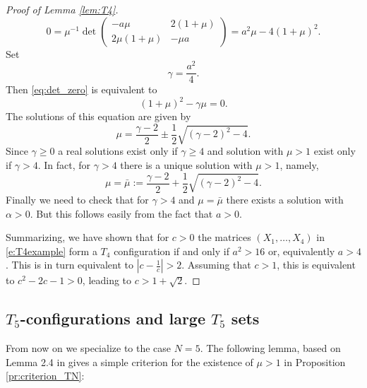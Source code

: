 \documentclass[titlepage]{amsart}
\numberwithin{equation}{section}
\theoremstyle{plain}
\theoremstyle{definition}
\theoremstyle{remark}
\begin{document}
\begin{proof}[Proof of Lemma \ref{lem:T4}]
\begin{equation}
0 = \mu^{-1} \det \begin{pmatrix} -a \mu &  2 (1 + \mu) \\
 2\mu (1 + \mu) &- \mu a
\end{pmatrix} = a^2 \mu - 4 (1+ \mu)^2.
\end{equation}
Set 
$$ \gamma = \frac{a^2}{4}.$$
Then  \eqref{eq:det_zero}
is equivalent to 
\begin{equation}   \label{eq:quadratic_eqn_mu}  (1 + \mu)^2 - \gamma \mu = 0.
\end{equation}
The solutions of this equation are given by 
$$ \mu = \frac{\gamma-2}{2} \pm \frac12 \sqrt{(\gamma-2)^2 - 4}.$$
Since $\gamma \ge 0$ a real solutions exist only if $\gamma \ge 4$ and solution with $\mu > 1$ exist 
only if $\gamma > 4$. In fact, for $\gamma > 4$ there is a unique solution with $\mu > 1$, namely, 
\begin{equation}  \label{eq:barmu}
\mu = \bar \mu:= \frac{\gamma-2}{2} +  \frac12 \sqrt{(\gamma-2)^2 - 4}.
\end{equation}
Finally we need to check that  for  $\gamma > 4$ and $\mu = \bar \mu$ there exists a solution with $\alpha > 0$. But this
 follows easily from the fact that $a > 0$.  
  
 Summarizing, we have shown that  for $c > 0$ the matrices $(X_1,\dots,X_4)$ in \eqref{e:T4example} form a $T_4$ configuration
  if and only if $a^2 > 16$ or, equivalently $a > 4$. This is in turn  equivalent to $|c-\frac{1}{c}|>2$. Assuming that $c>1$, this is equivalent to $c^2-2c-1>0$, leading to $c>1+\sqrt{2}$.   
\end{proof}








\subsection{$T_5$-configurations and large $T_5$ sets}

From now on we specialize to the case $N=5$. The following lemma, based on Lemma 2.4 in \cite{szekelyhidi_forster18} gives a simple criterion for the existence of $\mu>1$ in Proposition \ref{pr:criterion_TN}:
\end{document}

